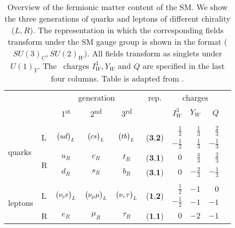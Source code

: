 \begingroup
\renewcommand*{\arraystretch}{1.2}
\begin{table}[]
\centering
\begin{tabular}{llccccrrrr}
\toprule
                        &                              &  \multicolumn{3}{c}{generation} &  rep.   & \multicolumn{3}{c}{charges} \\ \cline{7-9}  \cline{3-5}
                        &                              &   1\textsuperscript{st}    &   2\textsuperscript{nd}    &   3\textsuperscript{rd}   &  &   $I^3_W$    &   $Y_W$    &  $Q$    \\ \hline\\[-13pt]
\multirow{4}{*}{quarks} & \multirow{2}{*}{L}
&\multirow{2}{*}{$\pmqty{u\\d}_L$}&\multirow{2}{*}{$\pmqty{c\\s}_L$}&\multirow{2}{*}{$\pmqty{t\\b}_L$}&
\multirow{2}{*}{($\textbf{3}$,$\textbf{2}$)}  &$\frac{1}{2}$ &$\frac{1}{3}$ &$\frac{2}{3}$\\
                        &                              &       &       &      &  &  $-\frac{1}{2}$    & $\frac{1}{3}$&  $-\frac{1}{3}$    \\
                        & \multirow{2}{*}{R}&  $u_R$     &
                        $c_R$ &$t_R$      &($\textbf{3}$,$\textbf{1}$)& $0$    & $\frac{4}{3}$&  $\frac{2}{3}$    \\
                        &                              &  $d_R$     & $s_R$ &$b_R$      &($\textbf{3}$,$\textbf{1}$)&  $0$     &$-\frac{2}{3}$&  $-\frac{1}{3}$    \\ [1pt] \cline{1-9} \\[-13pt]
\multirow{4}{*}{leptons}& \multirow{2}{*}{L}
&\multirow{2}{*}{$\pmqty{\nu_{e}\\e}_L$}&\multirow{2}{*}{$\pmqty{\nu_{\mu}\\\mu}_L$}&\multirow{2}{*}{$\pmqty{\nu_{\tau}\\
    \tau}_L$}&\multirow{2}{*}{($\textbf{1}$,$\textbf{2}$)}&$\frac{1}{2}$&$-1$&$0$\\
                        &                              &       &       &      && $-\frac{1}{2}$&$-1$ &   $-1$   \\
                        &R& $e_R$      &  $\mu_R$      &    $\tau_R$  &($\textbf{1}$,$\textbf{1}$)&$0$ &$-2$ & $-1$     \\
\bottomrule
\end{tabular}
\caption{Overview of the fermionic matter content of the SM. We show the three generations of quarks
  and leptons of different chirality ($L,R$). The representation in which the corresponding fields transform under the
  SM gauge group is shown in the format ($SU(3)_C,SU(2)_W$). All fields transform as singlets under $U(1)_Y$. The \ew~charges $I_W^3,Y_W$ and $Q$ are specified in the last four
  columns. Table is adapted from \cite{Huss:2014eea}.}
\label{tab:smmatter}
\end{table}
